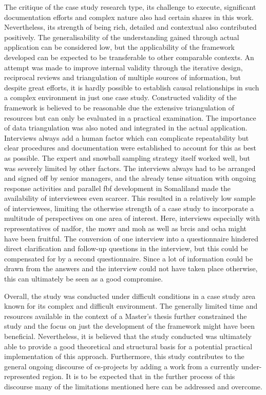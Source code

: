 The critique of the case study research type, its challenge to execute, significant documentation efforts and complex nature also had certain shares in this work. Nevertheless, its strength of being rich, detailed and contextual also contributed positively. The generalisability of the understanding gained through actual application can be considered low, but the applicability of the framework developed can be expected to be transferable to other comparable contexts.\newline
An attempt was made to improve internal validity through the iterative design, reciprocal reviews and triangulation of multiple sources of information, but despite great efforts, it is hardly possible to establish causal relationships in such a complex environment in just one case study. Constructed validity of the framework is believed to be reasonable due the extensive triangulation of resources but can only be evaluated in a practical examination. The importance of data triangulation was also noted and integrated in the actual application. Interviews always add a human factor which can complicate repeatability but clear procedures and documentation were established to account for this as best as possible. The expert and snowball sampling strategy itself worked well, but was severely limited by other factors. The interviews always had to be arranged and signed off by senior managers, and the already tense situation with ongoing response activities and parallel \acrshort{fbf} development in Somaliland made the availability of interviewees even scarcer. This resulted in a relatively low sample of interviewees, limiting the otherwise strength of a case study to incorporate a multitude of perspectives on one area of interest. Here, interviews especially with representatives of \acrshort{nadfor}, the \acrshort{mowr} and \acrshort{moh} as well as \acrshort{brcis} and \acrshort{ocha} might have been fruitful. The conversion of one interview into a questionnaire hindered direct clarification and follow-up questions in the interview, but this could be compensated for by a second questionnaire. Since a lot of information could be drawn from the answers and the interview could not have taken place otherwise, this can ultimately be seen as a good compromise.

Overall, the study was conducted under difficult conditions in a case study area known for its complex and difficult environment. The generally limited time and resources available in the context of a Master's thesis further constrained the study and the focus on just the development of the framework might have been beneficial. Nevertheless, it is believed that the study conducted was ultimately able to provide a good theoretical and structural basis for a potential practical implementation of this approach. Furthermore, this study contributes to the general ongoing discourse of \acrlong{cs}-projects by adding a work from a currently under-represented region. It is to be expected that in the further process of this discourse many of the limitations mentioned here can be addressed and overcome.

